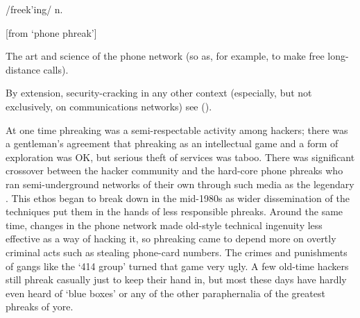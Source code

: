  /freek'ing/ n.

[from `phone phreak']
\begin{inparaenum}
	\item The art and science of  the phone network (so as, for example, to make free long-distance calls).
	\item By extension, security-cracking in any other context (especially, but not exclusively, on communications networks) see
		().
\end{inparaenum}

At one time phreaking was a semi-respectable activity among hackers; there was a gentleman's agreement that phreaking as an intellectual
game and a form of exploration was OK, but serious theft of services was taboo. There was significant crossover between the hacker
community and the hard-core phone phreaks who ran semi-underground networks of their own through such media as the legendary
. This ethos began to break down in the mid-1980s as wider dissemination of the techniques put them in the hands
of less responsible phreaks. Around the same time, changes in the phone network made old-style technical ingenuity less effective as a way
of hacking it, so phreaking came to depend more on overtly criminal acts such as stealing phone-card numbers. The crimes and punishments of
gangs like the `414 group' turned that game very ugly. A few old-time hackers still phreak casually just to keep their hand in, but most
these days have hardly even heard of `blue boxes' or any of the other paraphernalia of the greatest phreaks of yore.

